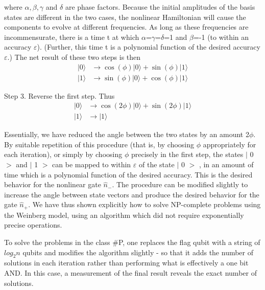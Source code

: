 \documentclass{article}
\begin{document}
where $\alpha,\beta,\gamma$ and $\delta$ are phase factors. Because the
initial amplitudes of the basis states are different in the two cases, the
nonlinear Hamiltonian will cause the components to evolve at different
frequencies. As long as these frequencies are incommensurate, there is a time
t at which $\alpha$=$\gamma$=$\delta$=1 and $\beta$=-1 (to within an accuracy
$\varepsilon$). (Further, this time t is a polynomial function of the desired
accuracy $\varepsilon$.) The net result of these two steps is then
\begin{align}
|0\rangle &  \longrightarrow\cos(\phi)|0\rangle+\sin(\phi)|1\rangle\\
|1\rangle &  \longrightarrow\sin(\phi)|0\rangle+\cos(\phi)|1\rangle
\end{align}

Step 3. Reverse the first step. Thus
\begin{align}
|0\rangle &  \longrightarrow\cos(2\phi)|0\rangle+\sin(2\phi)|1\rangle\\
|1\rangle &  \longrightarrow|1\rangle
\end{align}

Essentially, we have reduced the angle between the two states by an amount
2$\phi.$ By suitable repetition of this procedure (that is, by choosing $\phi$
appropriately for each iteration), or simply by choosing $\phi$ precisely in
the first step, the states
$\vert$%
0%
$>$%
and
$\vert$%
1%
$>$%
can be mapped to within $\varepsilon$ of the state
$\vert$%
0%
$>$%
, in an amount of time which is a polynomial function of the desired accuracy.
This is the desired behavior for the nonlinear gate $\widehat{n}_{-}$. The
procedure can be modified slightly to increase the angle between state vectors
and produce the desired behavior for the gate $\widehat{n}_{+}$. We have thus
shown explicitly how to solve NP-complete problems using the Weinberg model,
using an algorithm which did not require exponentially precise operations.

To solve the problems in the class \#P, one replaces the flag qubit with a
string of $log_{2}n$ qubits and modifies the algorithm slightly - so that it
adds the number of solutions in each iteration rather than performing what is
effectively a one bit AND. In this case, a measurement of the final result
reveals the exact number of solutions.
\end{document}
